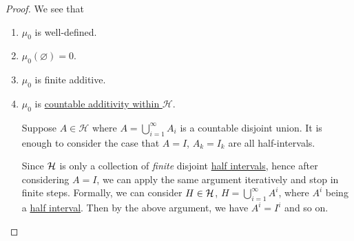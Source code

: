 \begin{proof}
	We see that
	\begin{enumerate}
		\item \(\mu _0\) is well-defined.
		\item \(\mu _0(\varnothing ) = 0\).
		\item \(\mu _0\) is finite additive.
		\item \(\mu _0\) is \hyperref[def:pre-measure-countable-additivity-within-the-algebra]{countable additivity within \(\mathcal{H}\)}.
		      \par Suppose \(A\in \mathcal{H} \) where \(A = \bigcup\limits_{i=1}^{\infty} A_{i}\) is a countable
		      disjoint union. It is enough to consider the case that \(A = I\), \(A_{k} = I_{k}\) are all
		      half-intervals.
		      \begin{remark}
			      Since \(\mathcal{\MakeUppercase{H}}\) is only a collection of \emph{finite} disjoint \hyperref[def:half-intervals]{half intervals}, hence
			      after considering \(A = I\), we can apply the same argument iteratively and stop in finite steps. Formally, we can consider \(H\in \mathcal{\MakeUppercase{H}} \),
			      \(H = \bigcup\limits_{i=1}^{\infty} A^{i}\), where \(A^i\) being a \hyperref[def:half-intervals]{half interval}. Then by the above argument, we have \(A^i = I^i\) and so on.
		      \end{remark}


\end{enumerate}
\end{proof}
